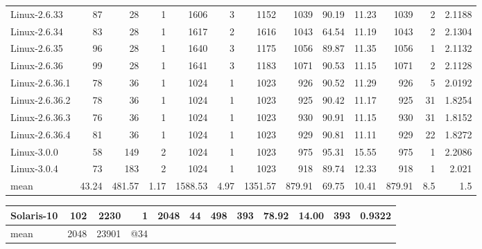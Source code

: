 \documentclass[11pt]{article}
\begin{document}
\begin{center}
\begin{tabular}{lrrrrrrrrrrrr}
 Linux-2.6.33           &     87  &      28  &                  1  &     1606  &     3  &      1152  &       1039  &    90.19  &    11.23  &    1039  &    2  &   2.1188  \\
 Linux-2.6.34           &     83  &      28  &                  1  &     1617  &     2  &      1616  &       1043  &    64.54  &    11.19  &    1043  &    2  &   2.1304  \\
 Linux-2.6.35           &     96  &      28  &                  1  &     1640  &     3  &      1175  &       1056  &    89.87  &    11.35  &    1056  &    1  &   2.1132  \\
 Linux-2.6.36           &     99  &      28  &                  1  &     1641  &     3  &      1183  &       1071  &    90.53  &    11.15  &    1071  &    2  &   2.1128  \\
 Linux-2.6.36.1         &     78  &      36  &                  1  &     1024  &     1  &      1023  &        926  &    90.52  &    11.29  &     926  &    5  &   2.0192  \\
 Linux-2.6.36.2         &     78  &      36  &                  1  &     1024  &     1  &      1023  &        925  &    90.42  &    11.17  &     925  &   31  &   1.8254  \\
 Linux-2.6.36.3         &     76  &      36  &                  1  &     1024  &     1  &      1023  &        930  &    90.91  &    11.15  &     930  &   31  &   1.8152  \\
 Linux-2.6.36.4         &     81  &      36  &                  1  &     1024  &     1  &      1023  &        929  &    90.81  &    11.11  &     929  &   22  &   1.8272  \\
 Linux-3.0.0            &     58  &     149  &                  2  &     1024  &     1  &      1023  &        975  &    95.31  &    15.55  &     975  &    1  &   2.2086  \\
 Linux-3.0.4            &     73  &     183  &                  2  &     1024  &     1  &      1023  &        918  &    89.74  &    12.33  &     918  &    1  &    2.021  \\
\hline
\hline
 mean                   &  43.24  &  481.57  &               1.17  &  1588.53  &  4.97  &   1351.57  &     879.91  &    69.75  &    10.41  &  879.91  &  8.5  &      1.5  \\
\hline
\end{tabular}
\end{center}






\begin{center}
\begin{tabular}{lrrrrrrrrrrr}
 Solaris-10  &   102  &   2230  &    1  &  2048  &  44  &  498  &  393  &  78.92  &  14.00  &  393  &  0.9322  \\
\hline
\hline
 mean        &  2048  &  23901  &  @34  &        &      &       &       &         &         &       &          \\
\end{tabular}
\end{center}
\end{document}
